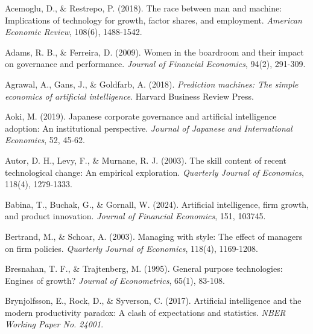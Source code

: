 \documentclass[12pt, a4paper]{article}
\begin{document}

\begin{thebibliography}{99}
Acemoglu, D., \& Restrepo, P. (2018). The race between man and machine: Implications of technology for growth, factor shares, and employment. \textit{American Economic Review}, 108(6), 1488-1542.

Adams, R. B., \& Ferreira, D. (2009). Women in the boardroom and their impact on governance and performance. \textit{Journal of Financial Economics}, 94(2), 291-309.

Agrawal, A., Gans, J., \& Goldfarb, A. (2018). \textit{Prediction machines: The simple economics of artificial intelligence}. Harvard Business Review Press.

Aoki, M. (2019). Japanese corporate governance and artificial intelligence adoption: An institutional perspective. \textit{Journal of Japanese and International Economies}, 52, 45-62.

Autor, D. H., Levy, F., \& Murnane, R. J. (2003). The skill content of recent technological change: An empirical exploration. \textit{Quarterly Journal of Economics}, 118(4), 1279-1333.

Babina, T., Buchak, G., \& Gornall, W. (2024). Artificial intelligence, firm growth, and product innovation. \textit{Journal of Financial Economics}, 151, 103745.

Bertrand, M., \& Schoar, A. (2003). Managing with style: The effect of managers on firm policies. \textit{Quarterly Journal of Economics}, 118(4), 1169-1208.

Bresnahan, T. F., \& Trajtenberg, M. (1995). General purpose technologies: Engines of growth? \textit{Journal of Econometrics}, 65(1), 83-108.

Brynjolfsson, E., Rock, D., \& Syverson, C. (2017). Artificial intelligence and the modern productivity paradox: A clash of expectations and statistics. \textit{NBER Working Paper No. 24001}.


\end{thebibliography}
\end{document}
